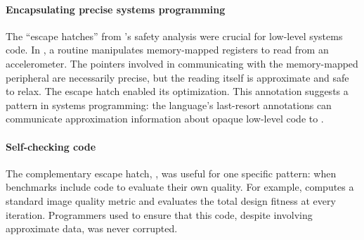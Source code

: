 \paragraph{Encapsulating precise systems programming}
The ``escape hatches'' from \sysname's safety analysis were crucial for
low-level systems code.
In , a routine manipulates memory-mapped registers to read
from an accelerometer. The pointers involved in
communicating with the memory-mapped peripheral are necessarily precise, but
the reading itself is approximate and safe to relax.
The \annpermit escape hatch enabled its optimization.
This annotation suggests a pattern in systems programming: the language's
last-resort annotations can communicate approximation information about
opaque low-level code to \sysname.

\paragraph{Self-checking code}
The complementary escape hatch, \annforbid, was useful for one specific
pattern: when benchmarks include code to evaluate their own quality. For
example,  computes a standard image quality metric and
 evaluates the total design fitness at every iteration.
Programmers used \annforbid to ensure that this code, despite involving
approximate data, was never corrupted.
